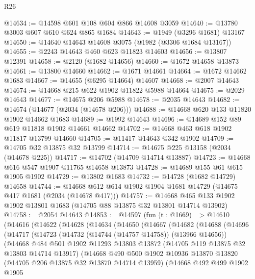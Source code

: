 \begin{lexlean}{R26}
\begin{coremodule}
@14634 := @14598 @601 @108 @604 @866 @14608 @3059
@14640 := @13780 @3003 @607 @610 @624 @865 @1684
@14643 := @1949 (@3296 @1681) @13167
@14650 := @14640 @14643 @14608 @3075 (@1982 (@3306 @1684 @13167))
@14655 := @2243 @14643 @460 @623 @11823 @14603
@14656 := @13807 @12391
@14658 := @2120 (@1682 @14656)
@14660 := @1672 @14658 @13873
@14661 := @13800 @14660
@14662 := @1671 @14661
@14664 := @1672 @14662 @1683
@14667 := @14655 (@6295 @14664) @14607
@14668 := @2007 @14643
@14674 := @14668 @215 @622 @1902 @11822 @5988 @14664
@14675 := @2029 @14643
@14677 := @14675 @206 @5988
@14678 := @2035 @14643
@14682 := @14674 (@14677 (@2034 (@14678 @206)))
@14688 := @14668 @620 @133 @11820 @1902 @14662 @1683
@14689 := @1992 @14643
@14696 := @14689 @152 @89 @619 @11818 @1902 @14661 @14662
@14702 := @14668 @463 @618 @1902 @11817 @13799 @14660
@14705 := @11417 @14643 @342 @1902
@14709 := @14705 @32 @13875 @32 @13799
@14714 := @14675 @225 @13158 (@2034 (@14678 @225))
@14717 := @14702 (@14709 @14714 @13887)
@14723 := @14668 @616 @547 @1907 @11765 @14658 @13873
@14728 := @14689 @155 @61 @615 @1905 @1902
@14729 := @13802 @1683
@14732 := @14728 (@1682 @14729) @14658
@14744 := @14668 @612 @614 @1902 @1904 @1681 @14729 (@14675 @417 @1681 (@2034 (@14678 @417)))
@14757 := @14668 @465 @133 @1902 @1902 @13801 @1683 (@14705 @88 @13875 @32 @13801 @14714 @13902)
@14758 := @2054 @14643
@14853 := @14597
    (fun (t : @1669) =>
    @14610
      (@14616
        (@14622
          (@14628
            (@14634
              (@14650
                (@14667
                  (@14682
                    (@14688
                      (@14696
                        (@14717
                          (@14723
                            (@14732 (@14744 (@14757 @14758)) (@13966 @14656))
                            (@14668
                              @484
                              @501
                              @1902
                              @11293
                              @13803
                              @13872
                              (@14705 @119 @13875 @32 @13803 @14714 @13917)
                              (@14668
                                @490
                                @500
                                @1902
                                @10936
                                @13870
                                @13820
                                (@14705 @206 @13875 @32 @13870 @14714 @13959)
                                (@14668
                                  @492
                                  @499
                                  @1902
                                  @1905

\end{coremodule}
\end{lexlean}
